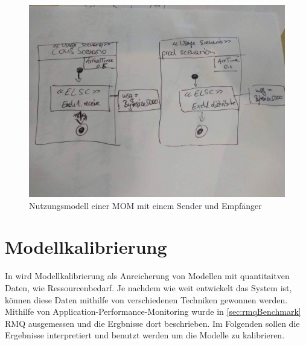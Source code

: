 \begin{figure}
\center
  \includegraphics[width=1\textwidth]{images/modelling/usage.png}
  \caption{Nutzungsmodell einer MOM mit einem Sender und Empfänger}
  \label{img:mom_usage}
\end{figure}

\section{Modellkalibrierung}
\label{sec:rmqRd}
In \cite{palladio17} wird Modellkalibrierung als Anreicherung von Modellen mit quantitaitven Daten, wie Ressourcenbedarf. Je nachdem wie weit entwickelt das System ist, können diese Daten mithilfe von verschiedenen Techniken gewonnen werden. Mithilfe von Application-Performance-Monitoring wurde in \autoref{sec:rmqBenchmark} RMQ ausgemessen und die Ergbnisse dort beschrieben. Im Folgenden sollen die Ergebnisse interpretiert und benutzt werden um die Modelle zu kalibrieren.


